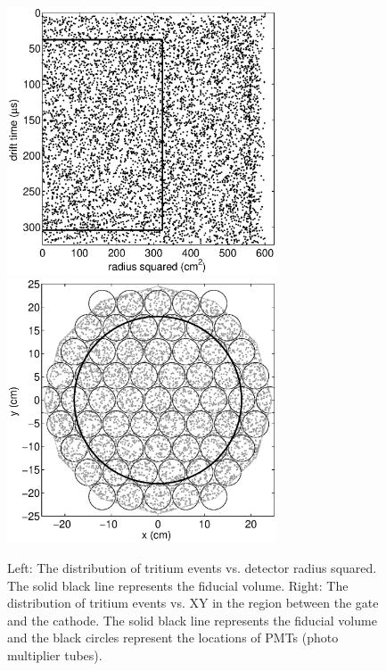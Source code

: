 \begin{figure}[h!]\centering
\includegraphics[width=80mm]{CH3T_RZ_scatter_lux10_20130812T1546.eps}
\includegraphics[width=80mm]{CH3T_XY_scatter_PMT_lux10_20130812T1546.eps}
\caption{Left: The distribution of tritium events vs. detector radius squared. The solid black line represents the fiducial volume. Right: The distribution of tritium events vs. XY in the region between the gate and the cathode. The solid black line represents the fiducial volume and the black circles represent the locations of PMTs (photo multiplier tubes).}
\label{fig:Density}
\end{figure}


